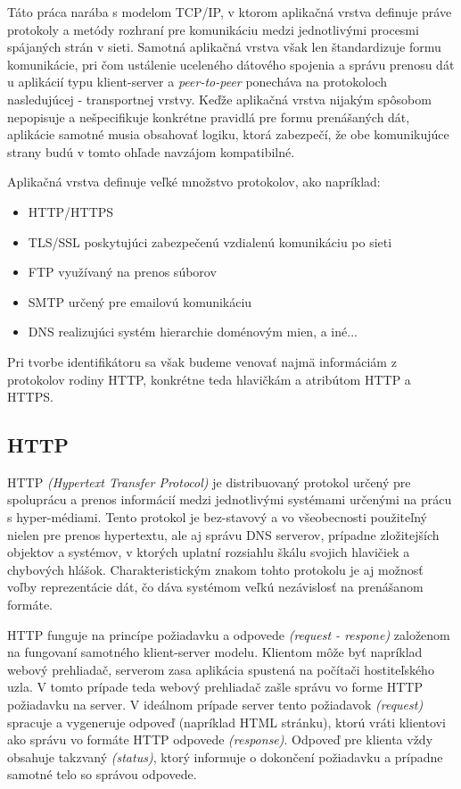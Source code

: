\documentclass[
  printed, %
  table,   %
  lof,     %
  lot,     %
]{fithesis3}
\begin{document}
Táto práca narába s modelom TCP/IP, v ktorom aplikačná vrstva definuje práve
protokoly a metódy rozhraní pre komunikáciu medzi jednotlivými procesmi
spájaných strán v sieti. Samotná aplikačná vrstva však len štandardizuje formu
komunikácie, pri čom ustálenie uceleného dátového spojenia a správu prenosu dát
u aplikácií typu klient-server a \textit{peer-to-peer} ponecháva na protokoloch
nasledujúcej - transportnej vrstvy. Keďže aplikačná vrstva nijakým spôsobom
nepopisuje a nešpecifikuje konkrétne pravidlá pre formu prenášaných dát,
aplikácie samotné musia obsahovať logiku, ktorá zabezpečí, že obe komunikujúce
strany budú v tomto ohľade navzájom kompatibilné.

Aplikačná vrstva definuje veľké množstvo protokolov, ako napríklad:
\begin{itemize}
	\item HTTP/HTTPS
	\item TLS/SSL poskytujúci zabezpečenú vzdialenú komunikáciu po sieti
	\item FTP využívaný na prenos súborov
	\item SMTP určený pre emailovú komunikáciu
	\item DNS realizujúci systém hierarchie doménovým mien, a iné...
\end{itemize}
Pri tvorbe identifikátoru sa však budeme venovať najmä informáciám z protokolov
rodiny HTTP, konkrétne teda hlavičkám a atribútom HTTP a HTTPS.

\subsection{HTTP}
HTTP \textit{(Hypertext Transfer Protocol)} je distribuovaný protokol určený
pre spoluprácu a prenos informácií medzi jednotlivými systémami určenými na
prácu s hyper-médiami. Tento protokol je bez-stavový a vo všeobecnosti
použiteľný nielen pre prenos hypertextu, ale aj správu DNS serverov, prípadne
zložitejších objektov a systémov, v ktorých uplatní rozsiahlu škálu svojich
hlavičiek a chybových hlášok. Charakteristickým znakom tohto protokolu je aj
možnosť voľby reprezentácie dát, čo dáva systémom veľkú nezávislosť na
prenášanom formáte.

HTTP funguje na princípe požiadavku a odpovede \textit{(request - respone)}
založenom na fungovaní samotného klient-server modelu. Klientom môže byť
napríklad webový prehliadač, serverom zasa aplikácia spustená na počítači
hostiteľského uzla. V tomto prípade teda webový prehliadač zašle správu vo
forme HTTP požiadavku na server. V ideálnom prípade server tento požiadavok
\textit{(request)} spracuje a vygeneruje odpoveď (napríklad HTML stránku),
ktorú vráti klientovi ako správu vo formáte HTTP odpovede \textit{(response)}.
Odpoveď pre klienta vždy obsahuje takzvaný \textit{(status)}, ktorý informuje o
dokončení požiadavku a prípadne samotné telo so správou odpovede.
\end{document}
